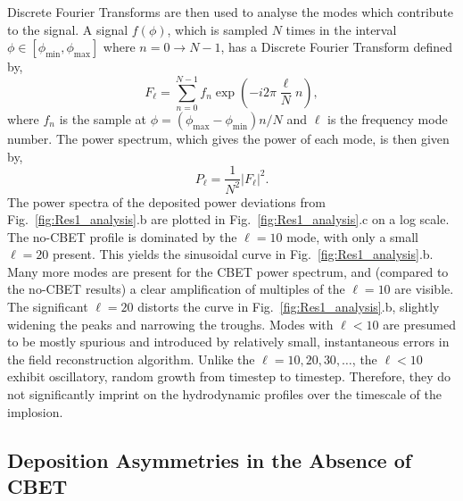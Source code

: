 Discrete Fourier Transforms are then used to analyse the modes which contribute to the signal.
A signal $f(\phi)$, which is sampled $N$ times in the interval $\phi\in[\phi_{\text{min}},\phi_{\text{max}}]$ where $n=0\rightarrow N-1$, has a Discrete Fourier Transform defined by,
\begin{equation}
    F_{\ell} = \sum_{n=0}^{N-1} f_n \exp{\left( -i2\pi \frac{\ell}{N}n \right)},
\end{equation}
where $f_n$ is the sample at $\phi=(\phi_{\text{max}}-\phi_{\text{min}})n/N$ and $\ell$ is the frequency mode number.
The power spectrum, which gives the power of each mode, is then given by,
\begin{equation}
    P_{\ell} = \frac{1}{N^2}|F_{\ell}|^2.
\end{equation}
The power spectra of the deposited power deviations from Fig.~\ref{fig:Res1_analysis}.b are plotted in Fig.~\ref{fig:Res1_analysis}.c on a log scale.
The no-\ac{CBET} profile is dominated by the $\ell=10$ mode, with only a small $\ell=20$ present.
This yields the sinusoidal curve in Fig.~\ref{fig:Res1_analysis}.b.
Many more modes are present for the \ac{CBET} power spectrum, and (compared to the no-\ac{CBET} results) a clear amplification of multiples of the $\ell=10$ are visible.
The significant $\ell=20$ distorts the curve in Fig.~\ref{fig:Res1_analysis}.b, slightly widening the peaks and narrowing the troughs.
Modes with $\ell<10$ are presumed to be mostly spurious and introduced by relatively small, instantaneous errors in the field reconstruction algorithm.
Unlike the $\ell=10,20,30,\ldots$, the $\ell<10$ exhibit oscillatory, random growth from timestep to timestep.
Therefore, they do not significantly imprint on the hydrodynamic profiles over the timescale of the implosion.


\subsection{Deposition Asymmetries in the Absence of CBET}%
\label{sec:Res1_noCBET_asymmetries}


